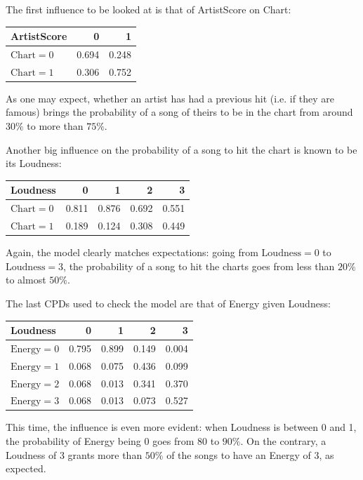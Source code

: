 \documentclass[a4paper, 12pt]{article}
\begin{document}
The first influence to be looked at is that of ArtistScore on Chart:
\begin{center}
    \begin{tabular}{lrr}
        \toprule
        ArtistScore          & 0     & 1     \\
        \midrule
        $\mathrm{Chart} = 0$ & 0.694 & 0.248 \\
        $\mathrm{Chart} = 1$ & 0.306 & 0.752 \\
        \bottomrule
    \end{tabular}
\end{center}
As one may expect, whether an artist has had a previous hit (i.e. if they are famous) brings the probability of a song of theirs to be in the chart from around $30\%$ to more than $75\%$.

Another big influence on the probability of a song to hit the chart is known to be its Loudness:
\begin{center}
    \begin{tabular}{lrrrr}
        \toprule
        Loudness             & 0     & 1     & 2     & 3     \\
        \midrule
        $\mathrm{Chart} = 0$ & 0.811 & 0.876 & 0.692 & 0.551 \\
        $\mathrm{Chart} = 1$ & 0.189 & 0.124 & 0.308 & 0.449 \\
        \bottomrule
    \end{tabular}
\end{center}
Again, the model clearly matches expectations: going from $\mathrm{Loudness} = 0$ to $\mathrm{Loudness} = 3$, the probability of a song to hit the charts goes from less than $20\%$ to almost $50\%$.

The last CPDs used to check the model are that of Energy given Loudness:
\begin{center}
    \begin{tabular}{lrrrr}
        \toprule
        Loudness              & 0     & 1     & 2     & 3     \\
        \midrule
        $\mathrm{Energy} = 0$ & 0.795 & 0.899 & 0.149 & 0.004 \\
        $\mathrm{Energy} = 1$ & 0.068 & 0.075 & 0.436 & 0.099 \\
        $\mathrm{Energy} = 2$ & 0.068 & 0.013 & 0.341 & 0.370 \\
        $\mathrm{Energy} = 3$ & 0.068 & 0.013 & 0.073 & 0.527 \\
        \bottomrule
    \end{tabular}
\end{center}
This time, the influence is even more evident: when Loudness is between 0 and 1, the probability of Energy being 0 goes from 80 to $90\%$. On the contrary, a Loudness of 3 grants more than $50\%$ of the songs to have an Energy of 3, as expected.
\end{document}
